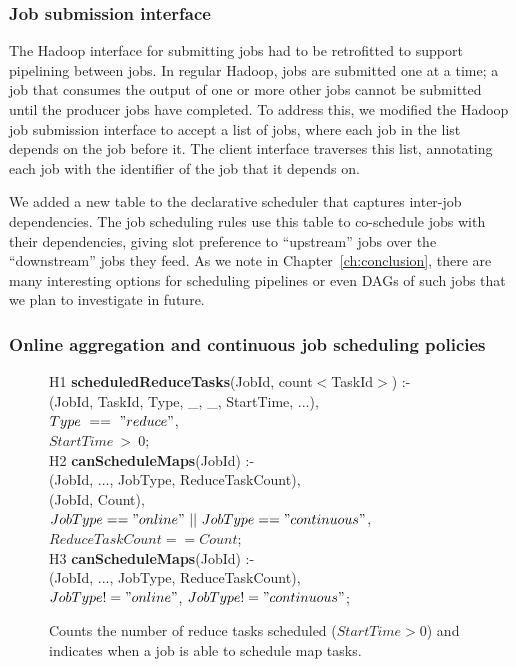 \subsubsection{Job submission interface}

The Hadoop {\JT} interface for submitting jobs had to be retrofitted to support pipelining between jobs. In
regular Hadoop, jobs are submitted one at a time; a job that consumes the output
of one or more other jobs cannot be submitted until the producer jobs have
completed. To address this, we modified the Hadoop job submission interface to
accept a list of jobs, where each job in the list depends on the job before
it. The client interface traverses this list, annotating each job with the
identifier of the job that it depends on. 

We added a new table to the declarative scheduler that captures inter-job dependencies.
The job scheduling rules use this table to co-schedule jobs with their dependencies, giving 
slot preference to ``upstream'' jobs over the ``downstream'' jobs they feed.  As we note in
Chapter~\ref{ch:conclusion}, there are many interesting options for scheduling
pipelines or even DAGs of such jobs that we plan to investigate in future.


\subsubsection{Online aggregation and continuous job scheduling policies}

\begin{figure}
\ssp
\centering
\begin{boxedminipage}{\linewidth}
H1 {\bf scheduledReduceTasks}(JobId, count$<$TaskId$>$) :- \\
(JobId, TaskId, Type, \_, \_, StartTime, ...), \\
\datalogspace $Type\ ==\ "reduce"$, \\
\datalogspace $StartTime\ >\ 0$; \\

H2 {\bf canScheduleMaps}(JobId) :- \\
(JobId, ..., JobType, ReduceTaskCount), \\
(JobId, Count), \\
\datalogspace $JobType == "online"\ ||\ JobType == "continuous"$, \\
\datalogspace $ReduceTaskCount == Count$; \\

H3 {\bf canScheduleMaps}(JobId) :- \\
(JobId, ..., JobType, ReduceTaskCount), \\
\datalogspace $JobType != "online"$, $JobType != "continuous"$; \\

\end{boxedminipage}
\caption{\label{ch:hop:fig:schedmaps} Counts the number of reduce tasks scheduled ($StartTime > 0$) and 
indicates when a job is able to schedule map tasks.}
\end{figure}


